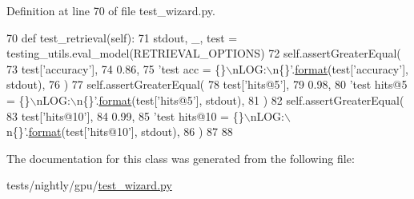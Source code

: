 Definition at line 70 of file test\+\_\+wizard.\+py.


\begin{DoxyCode}
70     \textcolor{keyword}{def }test\_retrieval(self):
71         stdout, \_, test = testing\_utils.eval\_model(RETRIEVAL\_OPTIONS)
72         self.assertGreaterEqual(
73             test[\textcolor{stringliteral}{'accuracy'}],
74             0.86,
75             \textcolor{stringliteral}{'test acc = \{\}\(\backslash\)nLOG:\(\backslash\)n\{\}'}.\hyperlink{namespaceparlai_1_1chat__service_1_1services_1_1messenger_1_1shared__utils_a32e2e2022b824fbaf80c747160b52a76}{format}(test[\textcolor{stringliteral}{'accuracy'}], stdout),
76         )
77         self.assertGreaterEqual(
78             test[\textcolor{stringliteral}{'hits@5'}],
79             0.98,
80             \textcolor{stringliteral}{'test hits@5 = \{\}\(\backslash\)nLOG:\(\backslash\)n\{\}'}.\hyperlink{namespaceparlai_1_1chat__service_1_1services_1_1messenger_1_1shared__utils_a32e2e2022b824fbaf80c747160b52a76}{format}(test[\textcolor{stringliteral}{'hits@5'}], stdout),
81         )
82         self.assertGreaterEqual(
83             test[\textcolor{stringliteral}{'hits@10'}],
84             0.99,
85             \textcolor{stringliteral}{'test hits@10 = \{\}\(\backslash\)nLOG:\(\backslash\)n\{\}'}.\hyperlink{namespaceparlai_1_1chat__service_1_1services_1_1messenger_1_1shared__utils_a32e2e2022b824fbaf80c747160b52a76}{format}(test[\textcolor{stringliteral}{'hits@10'}], stdout),
86         )
87 
88 
\end{DoxyCode}


The documentation for this class was generated from the following file\+:\begin{DoxyCompactItemize}
\item 
tests/nightly/gpu/\hyperlink{test__wizard_8py}{test\+\_\+wizard.\+py}\end{DoxyCompactItemize}

